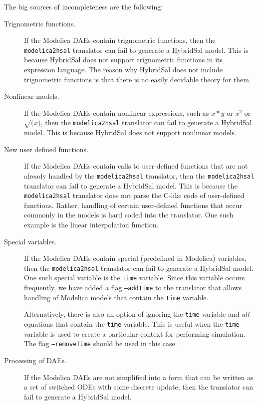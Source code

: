\documentclass{llncs}
\begin{document}
The big sources of incompleteness are the following:
\begin{description}
\item[Trignometric functions.]
If the Modelica DAEs contain trignometric functions, 
then the {\tt{modelica2hsal}} translator can fail to 
generate a HybridSal model. 
This is because HybridSal does not support trignometric
functions in its expression language.
The reason why HybridSal does not include trignometric
functions is that there is no easily decidable theory for
them.

\item[Nonlinear models.]
If the Modelica DAEs contain nonlinear expressions,
such as $x*y$ or $x^2$ or $\sqrt(x)$, then
the {\tt{modelica2hsal}} translator can fail to 
generate a HybridSal model. 
This is because HybridSal does not support nonlinear
models.

\item[New user defined functions.]
If the Modelica DAEs contain calls to user-defined
functions that are not already handled by
the {\tt{modelica2hsal}} translator, then
the {\tt{modelica2hsal}} translator can fail to 
generate a HybridSal model. 
This is because the {\tt{modelica2hsal}} translator
does not parse the C-like code of user-defined functions.
Rather, handling of certain user-defined functions that
occur commonly in the models is hard coded into the
translator.  One such example is 
the linear interpolation function.

\item[Special variables.]
If the Modelica DAEs contain special (predefined in Modelica) variables,
then
the {\tt{modelica2hsal}} translator can fail to 
generate a HybridSal model. 
One such special variable is the {\tt{time}} variable.
Since this variable occurs frequently, we have added a flag
{\tt{--addTime}} to the translator that allows handling of 
Modelica models that contain the {\tt{time}} variable.

Alternatively, there is also an option of ignoring the {\tt{time}}
variable and {\em{all}} equations that contain the {\tt{time}} variable.
This is useful when the {\tt{time}} variable is used to create a 
particular context for performing simulation. 
The flag {\tt{--removeTime}} should be used in this case.

\item[Processing of DAEs.]
If the Modelica DAEs are not simplified into a form that can
be written as a set of switched ODEs with some discrete update,
then the translator can fail to generate a HybridSal model.
\end{description}
\end{document}
